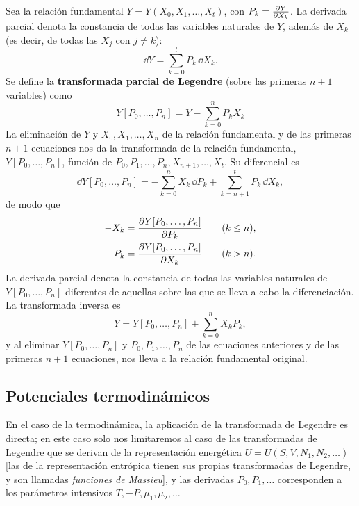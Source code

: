 Sea la relación fundamental $Y=Y(X_0,X_1,\dots,X_t)$, con $P_k=\pdv{Y}{X_k}$. La derivada parcial
denota la constancia de todas las variables naturales de $Y$, además de $X_k$ (es decir, de todas
las $X_j$ con $j\neq k$):
\begin{equation*}
  \dd Y=\sum_{k=0}^{t}P_k\,\dd X_k.
\end{equation*}
Se define la \textbf{transformada parcial de Legendre} (sobre las primeras $n+1$ variables) como
\begin{equation*}
  \boxed{Y[P_0,\dots,P_n]=Y-\sum_{k=0}^{n}P_kX_k}
\end{equation*}
La eliminación de $Y$ y $X_0,X_1,\dots,X_n$ de la relación fundamental y de las primeras $n+1$
ecuaciones nos da la transformada de la relación fundamental, $Y[P_0,\dots,P_n]$, función de
$P_0,P_1,\dots,P_n,X_{n+1},\dots,X_t$. Su diferencial es
\begin{equation*}
  \dd Y[P_0,\dots,P_n]=-\sum_{k=0}^{n}X_k\,\dd P_k+\sum_{k=n+1}^{t}P_k\,\dd X_k,
\end{equation*}
de modo que
\begin{align*}
  -X_k&=\pdv{Y[P_0,\dots,P_n]}{P_k}\qquad(k\leq n),\\
  P_k&=\pdv{Y[P_0,\dots,P_n]}{X_k}\qquad(k>n).
\end{align*}
La derivada parcial denota la constancia de todas las variables naturales de $Y[P_0,\dots,P_n]$
diferentes de aquellas sobre las que se lleva a cabo la diferenciación. La transformada inversa es
\begin{equation*}
  Y=Y[P_0,\dots,P_n]+\sum_{k=0}^{n}X_kP_k,
\end{equation*}
y al eliminar $Y[P_0,\dots,P_n]$ y $P_0,P_1,\dots,P_n$ de las ecuaciones anteriores y de las
primeras $n+1$ ecuaciones, nos lleva a la relación fundamental original.

\subsection*{Potenciales termodinámicos}

En el caso de la termodinámica, la aplicación de la transformada de Legendre es directa; en este
caso solo nos limitaremos al caso de las transformadas de Legendre que se derivan de la
representación energética $U=U(S,V,N_1,N_2,\dots)$ [las de la representación entrópica tienen sus
propias transformadas de Legendre, y son llamadas \emph{funciones de Massieu}], y las derivadas
$P_0,P_1,\dots$ corresponden a los parámetros intensivos $T,-P,\mu_1,\mu_2,\dots$

